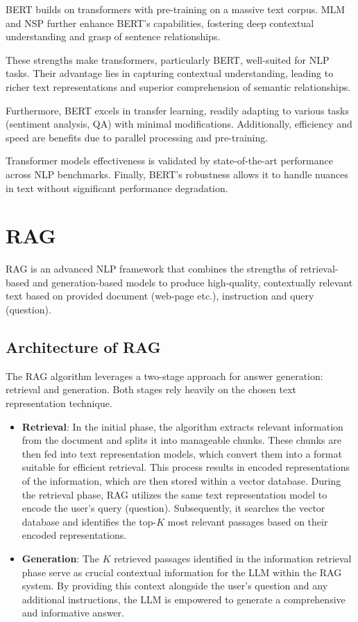 BERT builds on transformers with pre-training on a massive text corpus.
\ac{MLM} and \ac{NSP} further enhance \ac{BERT}'s capabilities, fostering deep contextual understanding and grasp of sentence relationships.

These strengths make transformers, particularly \ac{BERT}, well-suited for \ac{NLP} tasks.
Their advantage lies in capturing contextual understanding, leading to richer text representations and superior comprehension of semantic relationships.

Furthermore, \ac{BERT} excels in transfer learning, readily adapting to various tasks (sentiment analysis, \ac{QA}) with minimal modifications.
Additionally, efficiency and speed are benefits due to parallel processing and pre-training.

Transformer models effectiveness is validated by state-of-the-art performance across \ac{NLP} benchmarks.
Finally, \ac{BERT}'s robustness allows it to handle nuances in text without significant performance degradation.

\section{\ac{RAG}}
\ac{RAG} is an advanced \ac{NLP} framework that combines the strengths of retrieval-based and generation-based models to produce high-quality, contextually relevant text based on provided document (web-page etc.), instruction and query (question). 

\subsection{Architecture of \ac{RAG}}
The \ac{RAG} \cite{lewis2021retrievalaugmented} algorithm leverages a two-stage approach for answer generation: retrieval and generation.
Both stages rely heavily on the chosen text representation technique.

\begin{itemize}
  \item \textbf{Retrieval}:
    In the initial phase, the algorithm extracts relevant information from the document and splits it into manageable chunks.
    These chunks are then fed into text representation models, which convert them into a format suitable for efficient retrieval.
    This process results in encoded representations of the information, which are then stored within a vector database.
    During the retrieval phase, \ac{RAG} utilizes the same text representation model to encode the user's query (question).
    Subsequently, it searches the vector database and identifies the top-$K$ most relevant passages based on their encoded representations.
  \item \textbf{Generation}:
    The $K$ retrieved passages identified in the information retrieval phase serve as crucial contextual information for the \ac{LLM} within the \ac{RAG} system.
    By providing this context alongside the user's question and any additional instructions, the \ac{LLM} is empowered to generate a comprehensive and informative answer.
\end{itemize}

